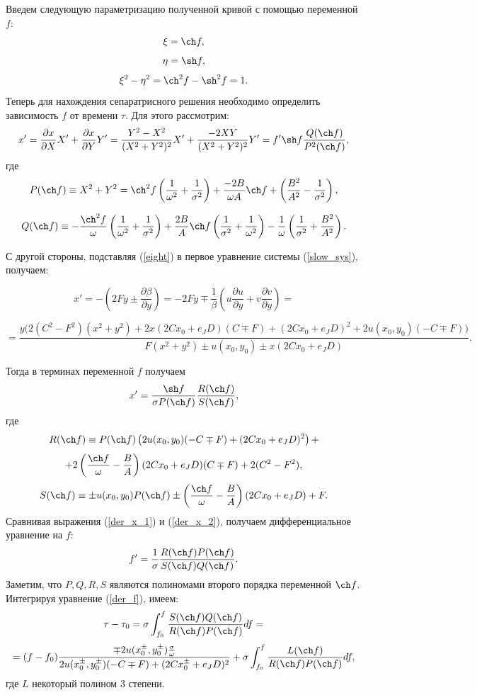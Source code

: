 Введем следующую параметризацию полученной кривой с помощью переменной $f$:
$$\xi = \ch f,$$
$$\eta = \sh f,$$
$$\xi^2-\eta^2 = \ch^2f - \sh^2f = 1.$$
Теперь для нахождения сепаратрисного решения необходимо определить зависимость $f$ от времени $\tau$. Для этого рассмотрим:
\begin{equation}
\label{der_x_1}
x' = \frac{\partial x}{\partial X}X'+\frac{\partial x}{\partial Y}Y' = \frac{Y^2-X^2}{(X^2+Y^2)^2}X' + \frac{-2XY}{(X^2+Y^2)^2}Y' = f' \sh f \frac{Q(\ch f)}{P^2(\ch f)},
\end{equation}
где
$$P(\ch f) \equiv X^2+Y^2 = \ch^2 f \left( \frac{1}{\omega^2} + \frac{1}{\sigma^2} \right) + \frac{-2B }{\omega A}\ch f + \left( \frac{B^2}{A^2}-\frac{1}{\sigma^2} \right),$$

$$Q(\ch f) \equiv  -\frac{\ch^2 f}{\omega} \left( \frac{1}{\omega^2}+\frac{1}{\sigma^2} \right) + \frac{2B}{A} \ch f \left( \frac{1}{\sigma^2}+\frac{1}{\omega^2} \right) - \frac{1}{\omega} \left( \frac{1}{\sigma^2} + \frac{B^2}{A^2} \right).$$

С другой стороны, подставляя (\ref{eight}) в первое уравнение системы (\ref{slow_sys}), получаем:

$$x' = -\left( 2Fy \pm \frac{\partial \beta}{\partial y} \right) = -2Fy \mp \frac{1}{\beta} \left( u \frac{\partial u}{\partial y} + v \frac{\partial v}{\partial y} \right) = $$

$$ = \frac{y \Big(2(C^2-F^2)(x^2+y^2) + 2x(2Cx_0+e_J D)(C \mp F) + (2Cx_0+e_J D)^2 + 2u(x_0, y_0)(-C \mp F)  \Big)}{F(x^2+y^2) \pm u(x_0, y_0) \pm x(2Cx_0+e_J D)}.$$

Тогда в терминах переменной $f$ получаем
\begin{equation}
\label{der_x_2}
x' = \frac{\sh f}{\sigma P(\ch f)} \frac{R(\ch f)}{S(\ch f)},
\end{equation}
где
$$R(\ch f) \equiv P(\ch f) \left( 2 u(x_0,y_0)(-C \mp F)+(2Cx_0+e_J D)^2 \right) +$$ 
$$ + 2 \left( \frac{\ch f}{\omega} - \frac{B}{A} \right)(2Cx_0 + e_J D)(C \mp F) + 2(C^2-F^2),$$
$$S(\ch f) \equiv \pm u(x_0,y_0) P(\ch f) \pm \left( \frac{\ch f}{\omega} - \frac{B}{A}\right) (2Cx_0+e_J D) + F.$$
Сравнивая выражения (\ref{der_x_1}) и (\ref{der_x_2}), получаем дифференциальное уравнение на $f$:
\begin{equation}
\label{der_f}
f' = \frac{1}{\sigma} \frac{R(\ch f) P(\ch f)}{S(\ch f)Q(\ch f)}.
\end{equation}
Заметим, что $P, Q, R, S$ являются полиномами второго порядка переменной $\ch f$.
Интегрируя уравнение (\ref{der_f}), имеем:
\begin{equation*}
\tau -\tau_0 = \sigma \int_{f_0}^f \frac{S(\ch f) Q(\ch f)}{R(\ch f)P(\ch f)} df = 
\end{equation*}
\begin{equation} = (f-f_0)\frac{\mp 2u(x_0^{\pm}, y_0^{\pm}) \frac{\sigma}{\omega}}{2u(x_0^{\pm},y_0^{\pm})(-C \mp F)+(2Cx_0^{\pm} + e_J D)^2} + \sigma \int_{f_0}^f \frac{L(\ch f)}{R(\ch f) P(\ch f)} df,
\label{f_tau}
\end{equation}
где $L$ некоторый полином 3 степени.


